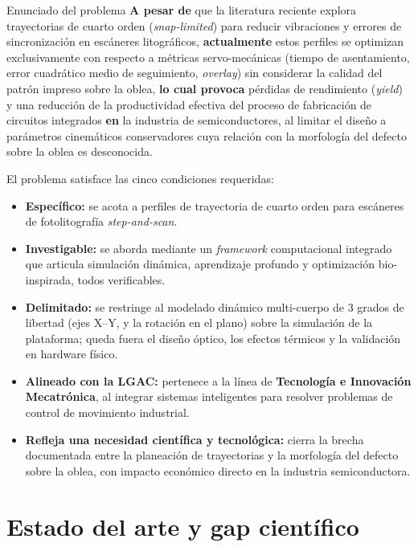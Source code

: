 \documentclass[11pt]{article}
\begin{document}
\begin{infobox}{Enunciado del problema}
\textbf{A pesar de} que la literatura reciente explora trayectorias de cuarto orden (\textit{snap-limited}) para reducir vibraciones y errores de sincronización en escáneres litográficos, \textbf{actualmente} estos perfiles se optimizan exclusivamente con respecto a métricas servo-mecánicas (tiempo de asentamiento, error cuadrático medio de seguimiento, \textit{overlay}) sin considerar la calidad del patrón impreso sobre la oblea, \textbf{lo cual provoca} pérdidas de rendimiento (\textit{yield}) y una reducción de la productividad efectiva del proceso de fabricación de circuitos integrados \textbf{en} la industria de semiconductores, al limitar el diseño a parámetros cinemáticos conservadores cuya relación con la morfología del defecto sobre la oblea es desconocida.
\end{infobox}

El problema satisface las cinco condiciones requeridas:

\begin{itemize}[leftmargin=1.5em, itemsep=2pt]
\item \textbf{Específico:} se acota a perfiles de trayectoria de cuarto orden para escáneres de fotolitografía \textit{step-and-scan}.
\item \textbf{Investigable:} se aborda mediante un \textit{framework} computacional integrado que articula simulación dinámica, aprendizaje profundo y optimización bio-inspirada, todos verificables.
\item \textbf{Delimitado:} se restringe al modelado dinámico multi-cuerpo de 3 grados de libertad (ejes X--Y, y la rotación en el plano) sobre la simulación de la plataforma; queda fuera el diseño óptico, los efectos térmicos y la validación en hardware físico.
\item \textbf{Alineado con la LGAC:} pertenece a la línea de \textbf{Tecnología e Innovación Mecatrónica}, al integrar sistemas inteligentes para resolver problemas de control de movimiento industrial.
\item \textbf{Refleja una necesidad científica y tecnológica:} cierra la brecha documentada entre la planeación de trayectorias y la morfología del defecto sobre la oblea, con impacto económico directo en la industria semiconductora.
\end{itemize}

\section{Estado del arte y gap científico}
\end{document}
